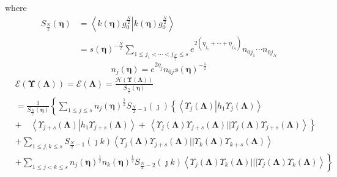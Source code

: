 \documentclass[aps,preprint]{revtex4}%
\begin{document}
where%
\begin{align*}
S_{\frac{N}{2}}\left(  \mathbf{\eta}\right)   &  =\left\langle \left.
k\left(  \mathbf{\eta}\right)  g_{0}^{\frac{N}{2}}\right\vert k\left(
\mathbf{\eta}\right)  g_{0}^{\frac{N}{2}}\right\rangle \\
&  =\mathit{s}\left(  \mathbf{\eta}\right)  ^{-\frac{N}{2}}\sum_{1\leq
j_{1}<\cdots<j_{\frac{N}{2}}\leq s}e^{2\left(  \eta_{j_{1}}+\cdots+\eta
_{j_{N}}\right)  }n_{0j_{1}}\cdots n_{0j_{N}}%
\end{align*}%
\begin{equation}
n_{j}\left(  \mathbf{\eta}\right)  =e^{2\eta_{j}}n_{0j}\mathit{s}\left(
\mathbf{\eta}\right)  ^{-\frac{1}{2}}%
\end{equation}%
\begin{align*}
&  \mathcal{E}\left(  \mathbf{\Upsilon}\left(  \mathbf{\Lambda}\right)
\right)  =\mathcal{E}\left(  \mathbf{\Lambda}\right)  =\frac{\mathcal{H}%
\left(  \mathbf{\Upsilon}\left(  \mathbf{\Lambda}\right)  \right)  }%
{S_{\frac{N}{2}}\left(  \mathbf{\eta}\right)  }\\
&  =\frac{1}{S_{\frac{N}{2}}\left(  \mathbf{\eta}\right)  }\left\{
\sum_{1\leq j\leq s}n_{j}\left(  \mathbf{\eta}\right)  ^{\frac{1}{2}}%
S_{\frac{N}{2}-1}\left(  \jmath\right)  \left\{  \left\langle \Upsilon
_{j}\left(  \mathbf{\Lambda}\right)  \left\vert h_{1}\Upsilon_{j}\left(
\mathbf{\Lambda}\right)  \right.  \right\rangle \right.  \right.  \\
&  \left.  +\quad\left\langle \Upsilon_{j+s}\left(  \mathbf{\Lambda}\right)
\left\vert h_{1}\Upsilon_{j+s}\left(  \mathbf{\Lambda}\right)  \right.
\right\rangle +\,\left\langle \Upsilon_{j}\left(  \mathbf{\Lambda}\right)
\Upsilon_{j+s}\left(  \mathbf{\Lambda}\right)  ||\Upsilon_{j}\left(
\mathbf{\Lambda}\right)  \Upsilon_{j+s}\left(  \mathbf{\Lambda}\right)
\right\rangle \right\}  \\
&  +\sum_{1\leq j,k\leq s}S_{\frac{N}{2}-1}\left(  \jmath k\right)
\left\langle \Upsilon_{j}\left(  \mathbf{\Lambda}\right)  \Upsilon
_{j+s}\left(  \mathbf{\Lambda}\right)  ||\Upsilon_{k}\left(  \mathbf{\Lambda
}\right)  \Upsilon_{k+s}\left(  \mathbf{\Lambda}\right)  \right\rangle \\
&  \left.  +\sum_{1\leq j<k\leq s}n_{j}\left(  \mathbf{\eta}\right)
^{\frac{1}{2}}n_{k}\left(  \mathbf{\eta}\right)  ^{\frac{1}{2}}S_{\frac{N}%
{2}-2}\left(  \jmath k\right)  \left\langle \Upsilon_{j}\left(
\mathbf{\Lambda}\right)  \Upsilon_{k}\left(  \mathbf{\Lambda}\right)
|||\Upsilon_{j}\left(  \mathbf{\Lambda}\right)  \Upsilon_{k}\left(
\mathbf{\Lambda}\right)  \right\rangle \right\}
\end{align*}
\end{document}
